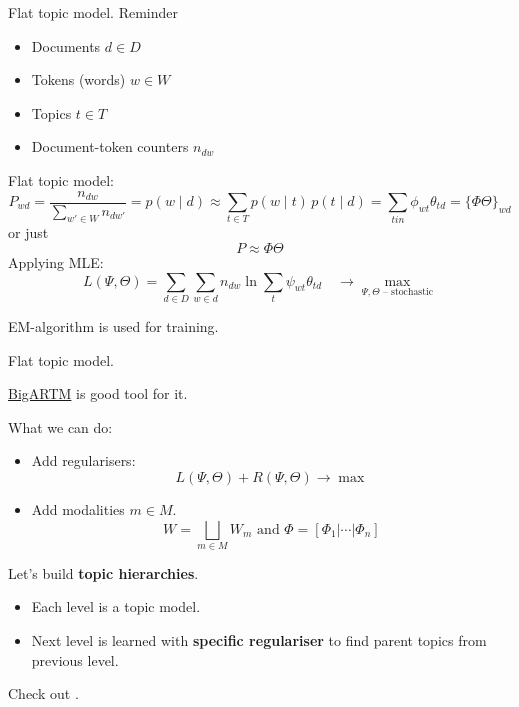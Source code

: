 \documentclass[10pt,aspectratio=1610]{beamer}
\begin{document}
\begin{frame}{Flat topic model. Reminder}
  \begin{itemize}
    \item Documents $d \in D$
    \item Tokens (words) $w \in W$
    \item Topics $t \in T$
    \item Document-token counters $n_{dw}$\\[3mm]
  \end{itemize}
  Flat topic model:\\[-1mm]
  $$
    P_{wd} = \dfrac{n_{dw}}{\sum_{w' \in W} n_{dw'}} = p(w \mid d) \approx \sum_{t \in T} p(w \mid t)\, p(t \mid d) = \sum_{tin} \phi_{wt} \theta_{td} = \{\Phi \Theta\}_{wd}
  $$
  or just
  $$
      P \approx \Phi \Theta
  $$
  \pause
  Applying MLE:
  $$
    L(\Psi, \Theta) = \sum_{d\in D}
      \sum_{w \in d} n_{dw} \ln 
        \sum_t \psi_{wt} \theta_{td} \quad
    \longrightarrow \max_{\Psi, \Theta \text{ -- stochastic}}
  $$

  EM-algorithm is used for training.
\end{frame}

\begin{frame}{Flat topic model.}

   \href{http://bigartm.org}{BigARTM} is good tool for it.

  What we can do:
  \begin{itemize}
    \item Add regularisers: \quad 
      $$ L(\Psi, \Theta) + R(\Psi, \Theta) 
         \longrightarrow \max $$
    \item Add modalities $m \in M$. 
      $$W = \bigsqcup_{m \in M} W_m  \text{ and } \Phi = [\Phi_1 | \cdots | \Phi_n ]$$
  \end{itemize}
  \vspace{5mm}
  \pause
  Let's build \textbf{topic hierarchies}.
  \begin{itemize}
    \item Each level is a topic model.
    \item Next level is learned with \textbf{specific regulariser} to find
parent topics from previous level.
  \end{itemize}
  \vspace{5mm}
  Check out \cite{vorontsov2014additive, vorontsov2014tutorial}.
\end{frame}
\end{document}
